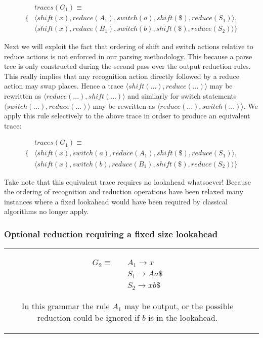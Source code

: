 \documentclass[11pt]{article}
\begin{document}
\parbox{.3\textwidth}{\begin{align*}
&traces(G_1) \equiv \\
\{ & \langle shift(x), reduce(A_1), switch(a), shift(\$), reduce(S_1) \rangle,\\
   & \langle shift(x), reduce(B_1), switch(b), shift(\$), reduce(S_2) \rangle \}
\end{align*}}

Next we will exploit the fact that ordering of shift and switch actions relative to reduce actions is not enforced in our parsing methodology. This because a parse tree is only constructed during the second pass over the output reduction rules.
This really implies that any recognition action directly followed by a reduce action may swap places. 
Hence a trace $\langle shift(...), reduce(...) \rangle$ may be rewritten as $\langle reduce(...), shift(...) \rangle$ and similarly for switch statements $\langle switch(...), reduce(...) \rangle$ may be rewritten as $\langle reduce(...), switch(...) \rangle$.
We apply this rule selectively to the above trace in ordser to produce an equivalent trace:

\parbox{.3\textwidth}{\begin{align*}
&traces(G_1) \equiv \\
\{ & \langle shift(x), switch(a), reduce(A_1), shift(\$), reduce(S_1) \rangle, \\
   & \langle shift(x), switch(b), reduce(B_1), shift(\$), reduce(S_2) \rangle \}
\end{align*}}

Take note that this equivalent trace requires no lookahead whatsoever! 
Because the ordering of recognition and reduction operations have been relaxed many instances where a fixed lookahead would have been required by classical algorithms no longer apply.

\subsubsection{Optional reduction requiring a fixed size lookahead}
\begin{tabular}[t]{cl}
\parbox{.3\textwidth}{
\begin{align*}
G_2 \equiv \quad & A_1 \rightarrow x\\
                 & S_1 \rightarrow A a \$\\
                 & S_2 \rightarrow x b \$
\end{align*}}
\parbox{.8\textwidth}{In this grammar the rule $A_1$ may be output, or the possible reduction could be ignored if $b$ is in the lookahead.}
\end{tabular}
\end{document}
